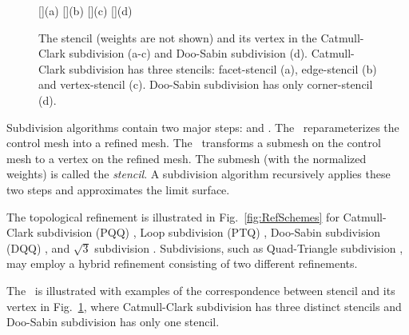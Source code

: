 
\begin{figure}[tb]
  \centering
  []{(a)}
  []{(b)}
  []{(c)}
  []{(d)}
  \caption{The stencil (weights are not shown) and its 
           vertex in the Catmull-Clark subdivision (a-c)
           and Doo-Sabin subdivision (d). Catmull-Clark
           subdivision has three stencils: facet-stencil (a), 
           edge-stencil (b) and vertex-stencil (c). 
           Doo-Sabin subdivision has only corner-stencil (d).}
  \label{fig:RefMap}
\end{figure}



Subdivision algorithms \cite{Warren:subdivision, Sub:course:2000} 
contain two major steps: \emph{\tr} and \emph{\gm}.
The \tr\ reparameterizes the control mesh into a refined 
mesh. The \gm\ transforms a submesh on the control mesh
to a vertex on the refined mesh. The submesh (with
the normalized weights) is called the
\emph{stencil}. A subdivision algorithm recursively 
applies these two steps and approximates the limit surface. 

The topological refinement is illustrated 
in Fig.~\ref{fig:RefSchemes} for Catmull-Clark
subdivision (PQQ) \cite{cc}, Loop subdivision (PTQ) \cite{loop},
Doo-Sabin subdivision (DQQ) \cite{ds}, and $\sqrt{3}$ subdivision
\cite{sqrt3}. Subdivisions, such as Quad-Triangle subdivision 
\cite{qts,l-pg-03}, may employ a hybrid refinement consisting
of two different refinements.

The \gm\ is illustrated with examples of the correspondence between
stencil and its vertex in Fig.~\ref{fig:RefMap}, where Catmull-Clark
subdivision has three distinct stencils and Doo-Sabin subdivision has
only one stencil. 

